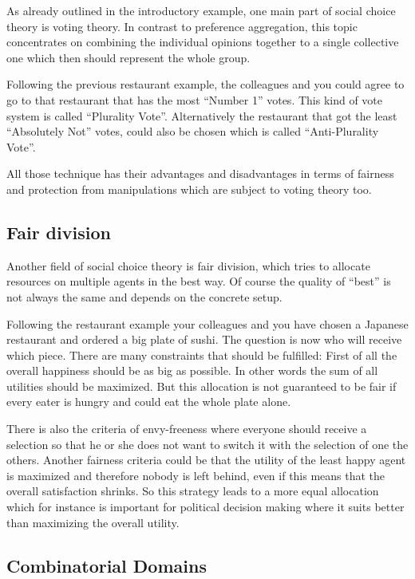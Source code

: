 \documentclass[a4paper]{paper}
\begin{document}
As already outlined in the introductory example, one main part of social choice theory is voting theory. In contrast to preference aggregation, this topic concentrates on combining the individual opinions together to a single collective one which then should represent the whole group.

Following the previous restaurant example, the colleagues and you could agree to go to that restaurant that has the most ``Number 1'' votes. This kind of vote system is called ``Plurality Vote''. Alternatively the restaurant that got the least ``Absolutely Not'' votes, could also be chosen which is called ``Anti-Plurality Vote''.

All those technique has their advantages and disadvantages in terms of fairness and protection from manipulations which are subject to voting theory too.~\cite[Chapter~3]{BCE12}

\subsection{Fair division}

Another field of social choice theory is fair division, which tries to allocate resources on multiple agents in the best way. Of course the quality of ``best'' is not always the same and depends on the concrete setup.

Following the restaurant example your colleagues and you have chosen a Japanese restaurant and ordered a big plate of sushi. The question is now who will receive which piece. There are many constraints that should be fulfilled: First of all the overall happiness should be as big as possible. In other words the sum of all utilities should be maximized. But this allocation is not guaranteed to be fair if every eater is hungry and could eat the whole plate alone.

There is also the criteria of envy-freeness where everyone should receive a selection so that he or she does not want to switch it with the selection of one the others. Another fairness criteria could be that the utility of the least happy agent is maximized and therefore nobody is left behind, even if this means that the overall satisfaction shrinks. So this strategy leads to a more equal allocation which for instance is important for political decision making where it suits better than maximizing the overall utility.~\cite[Chapter~5]{BCE12}

\subsection{Combinatorial Domains}
\end{document}
